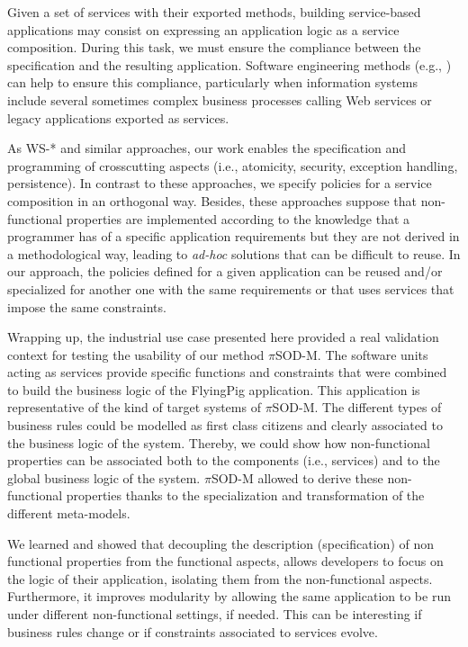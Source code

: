 \documentclass{singlecol-new}
\theoremstyle{TH}{
\newtheorem{lemma}{Lemma}
\newtheorem{theorem}[lemma]{Theorem}
\newtheorem{corrolary}[lemma]{Corrolary}
\newtheorem{conjecture}[lemma]{Conjecture}
\newtheorem{proposition}[lemma]{Proposition}
\newtheorem{claim}[lemma]{Claim}
\newtheorem{stheorem}[lemma]{Wrong Theorem}
\newtheorem{algorithm}{Algorithm}
}
\theoremstyle{THrm}{
\newtheorem{definition}{Definition}[section]
\newtheorem{question}{Question}[section]
\newtheorem{remark}{Remark}
\newtheorem{scheme}{Scheme}
}
\theoremstyle{THhit}{
\newtheorem{case}{Case}[section]
}
\theoremstyle{THhsl}{
\newtheorem{example}{Example}
}
\begin{document}
Given a set of services with their exported methods, building service-based applications may consist on expressing an application logic as a service composition.
During this task, we must ensure the compliance between the specification and the resulting application.
Software engineering methods (e.g., \cite{2,decastro1,PapazoglouH06}) can help to ensure this compliance, particularly when information systems include several sometimes complex business processes calling Web services or legacy applications exported as services.

As WS-* and similar approaches, our work enables the specification and programming of crosscutting aspects (i.e., atomicity, security, exception handling, persistence).
In contrast to these approaches, we specify policies for a {service composition} in an orthogonal way. Besides, these approaches suppose that non-functional properties are implemented {according to the knowledge} that a programmer has of a specific application requirements but they are not derived in a methodological way, leading to \textit{ad-hoc} solutions that can be difficult to reuse. In our approach,  the policies defined for a given application  can be reused and/or specialized for another one with the same requirements or that uses services that impose the same constraints. 

Wrapping up, the industrial use case presented here  provided a real validation context for testing the usability of our method $\pi$SOD-M. The software units acting as services provide specific functions and constraints that were combined to build the business logic of the FlyingPig application.  This application is  representative of the kind of target systems of $\pi$SOD-M. The different types of business rules could be  modelled as first class citizens and clearly associated to the business logic of the system. Thereby, we could show  how non-functional properties can be associated both to the components (i.e., services)  and to the global business logic of the system. $\pi$SOD-M allowed to derive these non-functional properties thanks to the specialization and transformation of the different meta-models. 

We learned and showed that decoupling the description (specification) of non functional properties from the functional aspects, allows developers  to focus on the logic of their application, isolating them from the   non-functional aspects. Furthermore, it improves modularity by allowing the same application to be run under different non-functional settings, if needed. This can be interesting if business rules change or if constraints associated to services evolve.
\end{document}
